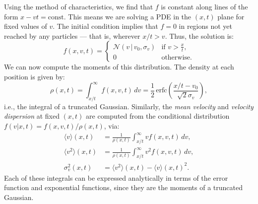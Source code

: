             Using the method of characteristics, we find that \( f \) is constant along lines of the form \( x - vt = \text{const} \). This means we are solving a PDE in the \( (x,t) \) plane for fixed values of \( v \). The initial condition implies that \( f=0 \) in regions not yet reached by any particles — that is, wherever \( x/t > v \). Thus, the solution is:
            \begin{equation}
                f(x,v,t) = 
                \begin{cases}
                    \mathcal{N}(v \,|\, v_0, \sigma_v) & \text{if } v > \frac{x}{t}, \\
                    0 & \text{otherwise}.
                \end{cases}
                \label{eq:one_dimensional_collisionless_streaming}
            \end{equation}
            We can now compute the moments of this distribution. The density at each position is given by:
            \begin{equation}
                \rho(x,t) = \int_{x/t}^{\infty} f(x,v,t) \, dv = \frac{1}{2} \, \mathrm{erfc}\left( \frac{x/t - v_0}{\sqrt{2}\sigma_v} \right),
            \end{equation}
            i.e., the integral of a truncated Gaussian. Similarly, the \textit{mean velocity} and \textit{velocity dispersion} at fixed \( (x,t) \) are computed from the conditional distribution \( f(v|x,t) = f(x,v,t)/\rho(x,t) \), via:
            \begin{equation}
                \begin{aligned}
                    \langle v \rangle(x,t) &= \frac{1}{\rho(x,t)} \int_{x/t}^\infty v f(x,v,t) \, dv, \\
                    \langle v^2 \rangle(x,t) &= \frac{1}{\rho(x,t)} \int_{x/t}^\infty v^2 f(x,v,t) \, dv, \\
                    \sigma_v^2(x,t) &= \langle v^2 \rangle(x,t) - \langle v \rangle(x,t)^2.
                \end{aligned}
            \end{equation}
            Each of these integrals can be expressed analytically in terms of the error function and exponential functions, since they are the moments of a truncated Gaussian.

